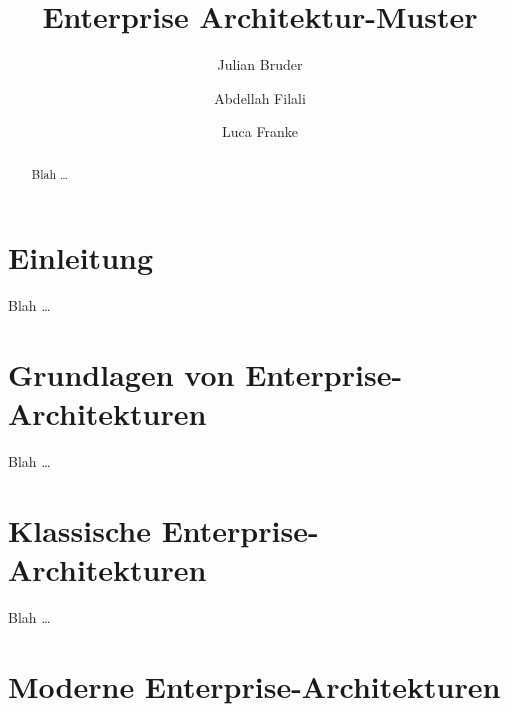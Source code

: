 \documentclass[acmtog]{acmart}
\begin{document}
\title{Enterprise Architektur-Muster}

\author{Julian Bruder}
\author{Abdellah Filali}
\authornotemark[1]
\author{Luca Franke}
\authornotemark[1]
\renewcommand{\shortauthors}{Bruder, Filali, Franke}

\begin{abstract}
Blah \ldots
\end{abstract}

\maketitle

\section{Einleitung}
Blah \ldots

\section{Grundlagen von Enterprise-Architekturen}
Blah \ldots

\section{Klassische Enterprise-Architekturen}
Blah \ldots

\section{Moderne Enterprise-Architekturen}
\end{document}
